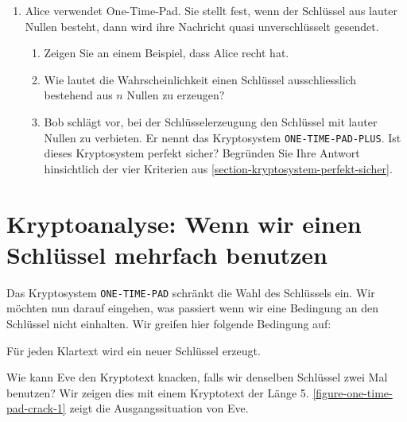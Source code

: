 \begin{enumerate}

\fillwithgrid{1in}

\newpage

\item Alice verwendet One-Time-Pad. Sie stellt fest, wenn der Schlüssel aus lauter Nullen besteht, dann wird ihre Nachricht quasi unverschlüsselt gesendet.
\begin{enumerate}
\item Zeigen Sie an einem Beispiel, dass Alice recht hat.
\fillwithgrid{2in}
\item Wie lautet die Wahrscheinlichkeit einen Schlüssel ausschliesslich bestehend aus $n$ Nullen zu erzeugen?
\fillwithgrid{2in}
\item Bob schlägt vor, bei der Schlüsselerzeugung den Schlüssel mit lauter Nullen zu verbieten. Er nennt das Kryptosystem \texttt{ONE-TIME-PAD-PLUS}. Ist dieses Kryptosystem perfekt sicher? Begründen Sie Ihre Antwort hinsichtlich der vier Kriterien aus \autoref{section-kryptosystem-perfekt-sicher}.
\fillwithgrid{2in}
\end{enumerate}
\end{enumerate}

\newpage

\section{Kryptoanalyse: Wenn wir einen Schlüssel mehrfach benutzen}

Das Kryptosystem \texttt{ONE-TIME-PAD} schränkt die Wahl des Schlüssels ein. Wir möchten nun darauf eingehen, was passiert wenn wir eine Bedingung an den Schlüssel nicht einhalten. Wir greifen hier folgende Bedingung auf:

\begin{center}
	Für jeden Klartext wird ein neuer Schlüssel erzeugt.
\end{center}

Wie kann Eve den Kryptotext knacken, falls wir denselben Schlüssel zwei Mal benutzen? Wir zeigen dies mit einem Kryptotext der Länge \num{5}. \autoref{figure-one-time-pad-crack-1} zeigt die Ausgangssituation von Eve.

